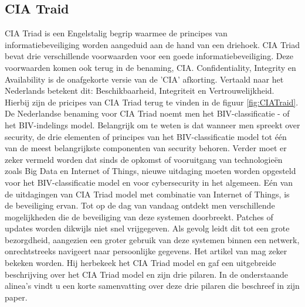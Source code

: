 \subsection{CIA Traid}
CIA Triad is een Engelstalig begrip waarmee de principes van informatiebeveiliging worden aangeduid aan de hand van een driehoek. CIA Triad bevat drie verschillende voorwaarden voor een goede informatiebeveiliging. Deze voorwaarden komen ook terug in de benaming, CIA. Confidentiality, Integrity en Availability is de onafgekorte versie van de 'CIA' afkorting. Vertaald naar het Nederlands betekent dit: Beschikbaarheid, Integriteit en Vertrouwelijkheid. Hierbij zijn de pricipes van CIA Triad terug te vinden in de figuur \ref{fig:CIATraid}. De Nederlandse benaming voor CIA Triad noemt men het BIV-classificatie - of het BIV-indelings model. Belangrijk om te weten is dat wanneer men spreekt over security, de drie elementen of principes van het BIV-classificatie model tot één van de meest belangrijkste componenten van security behoren. 
\newline
\newline 
Verder moet er zeker vermeld worden dat sinds de opkomst of vooruitgang van technologieën zoals Big Data en Internet of Things, nieuwe uitdaging moeten worden opgesteld voor het BIV-classificatie model en voor cybersecurity in het algemeen.
\newline
\newline  
Eén van de uitdagingen van CIA Triad model met combinatie van Internet of Things, is de beveiliging ervan. Tot op de dag van vandaag ontdekt men verschillende mogelijkheden die de beveiliging van deze systemen doorbreekt. Patches of updates worden dikwijls niet snel vrijgegeven. Als gevolg leidt dit tot een grote bezorgdheid, aangezien een groter gebruik van deze systemen binnen een netwerk, onrechtstreeks navigeert naar persoonlijke gegevens.
\newline
\newline 
Het artikel van \cite{Samonas2014} mag zeker bekeken worden. Hij herbekeek het CIA Triad model en gaf een uitgebreide beschrijving over het CIA Triad model en zijn drie pilaren. In de onderstaande alinea’s vindt u een korte samenvatting over deze drie pilaren die \cite{Samonas2014} beschreef in zijn paper.

